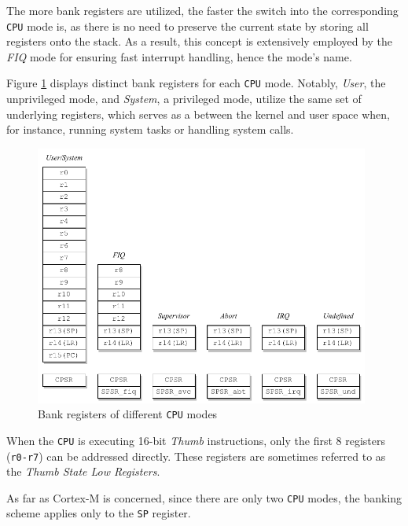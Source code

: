 \documentclass[english, ing, kiv, he, iso690numb, pdf]{fasthesis}
\begin{document}
	The more bank registers are utilized, the faster the switch into the corresponding \texttt{CPU} mode is, as there is no need to preserve the current state by storing all registers onto the stack. As a result, this concept is extensively employed by the \textit{FIQ} mode for ensuring fast interrupt handling, hence the mode's name.
	
	Figure \ref{Bank registers of different CPU modes} displays distinct bank registers for each \texttt{CPU} mode. Notably, \textit{User}, the unprivileged mode, and \textit{System}, a privileged mode, utilize the same set of underlying registers, which serves as a  between the kernel and user space when, for instance, running system tasks or handling system calls.
	
	\begin{figure}[ht]
		\centering
		\includegraphics[width=0.98\textwidth]{img/diagrams/bank_registers_2.pdf}
		\caption{Bank registers of different \texttt{CPU} modes}
		\label{Bank registers of different CPU modes}
	\end{figure}
	
	When the \texttt{CPU} is executing 16-bit \textit{Thumb} instructions, only the first 8 registers (\texttt{r0-r7}) can be addressed directly. These registers are sometimes referred to as the \textit{Thumb State Low Registers}.
	
	\newpage
	
	\begin{important}
		As far as Cortex-M is concerned, since there are only two \texttt{CPU} modes, the banking scheme applies only to the \texttt{SP} register.
	\end{important}
	
\end{document}
